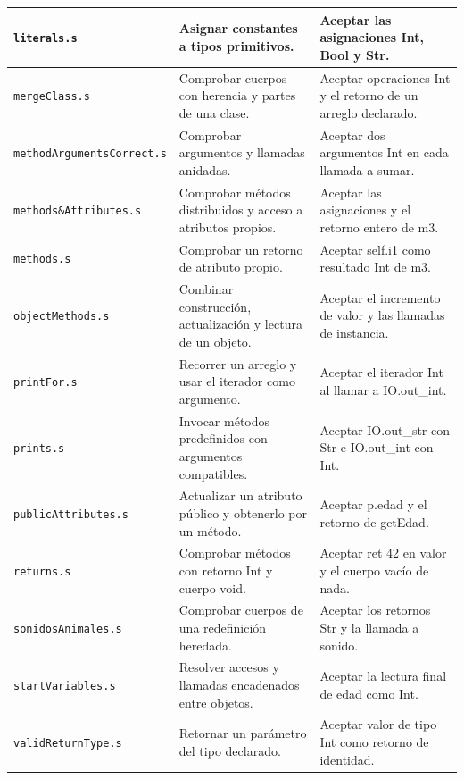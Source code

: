 \begin{longtable}{|>{\raggedright\arraybackslash}p{}|>{\raggedright\arraybackslash}p{}|>{\raggedright\arraybackslash}p{}|}
\texttt{literals.s} & Asignar constantes a tipos primitivos. & Aceptar las asignaciones Int, Bool y Str. \\ \hline
\texttt{merge\allowbreak Class.s} & Comprobar cuerpos con herencia y partes de una clase. & Aceptar operaciones Int y el retorno de un arreglo declarado. \\ \hline
\texttt{method\allowbreak Arguments\allowbreak Correct.s} & Comprobar argumentos y llamadas anidadas. & Aceptar dos argumentos Int en cada llamada a sumar. \\ \hline
\texttt{methods\&Attributes.s} & Comprobar métodos distribuidos y acceso a atributos propios. & Aceptar las asignaciones y el retorno entero de m3. \\ \hline
\texttt{methods.s} & Comprobar un retorno de atributo propio. & Aceptar self.i1 como resultado Int de m3. \\ \hline
\texttt{object\allowbreak Methods.s} & Combinar construcción, actualización y lectura de un objeto. & Aceptar el incremento de valor y las llamadas de instancia. \\ \hline
\texttt{print\allowbreak For.s} & Recorrer un arreglo y usar el iterador como argumento. & Aceptar el iterador Int al llamar a IO.out\_int. \\ \hline
\texttt{prints.s} & Invocar métodos predefinidos con argumentos compatibles. & Aceptar IO.out\_str con Str e IO.out\_int con Int. \\ \hline
\texttt{public\allowbreak Attributes.s} & Actualizar un atributo público y obtenerlo por un método. & Aceptar p.edad y el retorno de getEdad. \\ \hline
\texttt{returns.s} & Comprobar métodos con retorno Int y cuerpo void. & Aceptar ret 42 en valor y el cuerpo vacío de nada. \\ \hline
\texttt{sonidos\allowbreak Animales.s} & Comprobar cuerpos de una redefinición heredada. & Aceptar los retornos Str y la llamada a sonido. \\ \hline
\texttt{start\allowbreak Variables.s} & Resolver accesos y llamadas encadenados entre objetos. & Aceptar la lectura final de edad como Int. \\ \hline
\texttt{valid\allowbreak Return\allowbreak Type.s} & Retornar un parámetro del tipo declarado. & Aceptar valor de tipo Int como retorno de identidad. \\ \hline
\end{longtable}
\endgroup
